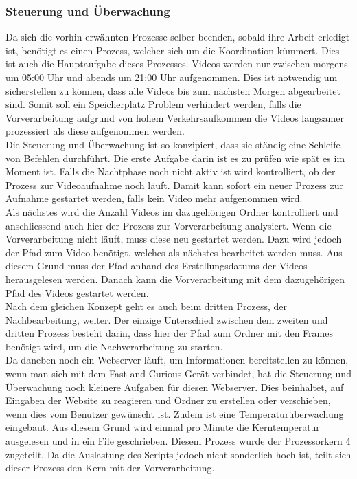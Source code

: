 \subsubsection{Steuerung und Überwachung}
Da sich die vorhin erwähnten Prozesse selber beenden, sobald ihre Arbeit erledigt ist, benötigt es einen Prozess, welcher sich um die Koordination kümmert. Dies ist auch die Hauptaufgabe dieses Prozesses. Videos werden nur zwischen morgens um 05:00 Uhr und abends um 21:00 Uhr aufgenommen. Dies ist notwendig um sicherstellen zu können, dass alle Videos bis zum nächsten Morgen abgearbeitet sind. Somit soll ein Speicherplatz Problem verhindert werden, falls die Vorverarbeitung aufgrund von hohem Verkehrsaufkommen die Videos langsamer prozessiert als diese aufgenommen werden.\\
Die Steuerung und Überwachung ist so konzipiert, dass sie ständig eine Schleife von Befehlen durchführt. Die erste Aufgabe darin ist es zu prüfen wie spät es im Moment ist. Falls die Nachtphase noch nicht aktiv ist wird kontrolliert, ob der Prozess zur Videoaufnahme noch läuft. Damit kann sofort ein neuer Prozess zur Aufnahme gestartet werden, falls kein Video mehr aufgenommen wird.\\
Als nächstes wird die Anzahl Videos im dazugehörigen Ordner kontrolliert und anschliessend auch hier der Prozess zur Vorverarbeitung analysiert. Wenn die Vorverarbeitung nicht läuft, muss diese neu gestartet werden. Dazu wird jedoch der Pfad zum Video benötigt, welches als nächstes bearbeitet werden muss. Aus diesem Grund muss der Pfad anhand des Erstellungsdatums der Videos herausgelesen werden. Danach kann die Vorverarbeitung mit dem dazugehörigen Pfad des Videos gestartet werden.\\
Nach dem gleichen Konzept geht es auch beim dritten Prozess, der Nachbearbeitung, weiter. Der einzige Unterschied zwischen dem zweiten und dritten Prozess besteht darin, dass hier der Pfad zum Ordner mit den Frames benötigt wird, um die Nachverarbeitung zu starten.\\
Da daneben noch ein Webserver läuft, um Informationen bereitstellen zu können, wenn man sich mit dem Fast and Curious Gerät verbindet, hat die Steuerung und Überwachung noch kleinere Aufgaben für diesen Webserver. Dies beinhaltet, auf Eingaben der Website zu reagieren und Ordner zu erstellen oder verschieben, wenn dies vom Benutzer gewünscht ist. Zudem ist eine Temperaturüberwachung eingebaut. Aus diesem Grund wird einmal pro Minute die Kerntemperatur ausgelesen und in ein File geschrieben. Diesem Prozess wurde der Prozessorkern 4 zugeteilt. Da die Auslastung des Scripts jedoch nicht sonderlich hoch ist, teilt sich dieser Prozess den Kern mit der Vorverarbeitung. \cite{Bash}